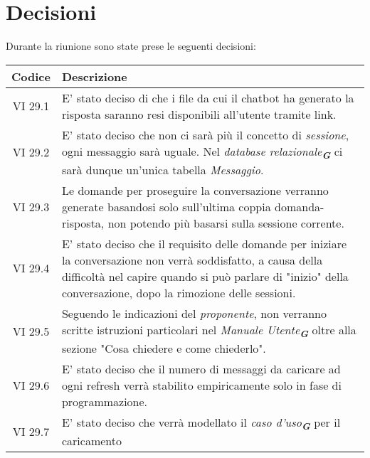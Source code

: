
\section{Decisioni}

Durante la riunione sono state prese le seguenti decisioni:

\vspace{0.5cm}

\begin{table}[htbp]
    \centering
    \begin{tabular}{|c|p{}|}
        \hline
        \rowcolor[gray]{0.75}
        \textbf{Codice} & \textbf{Descrizione}\\
        \hline
        VI 29.1 & E' stato deciso di che i file da cui il chatbot ha generato la risposta saranno resi disponibili all'utente tramite
        link.\\ 
        \hline
        VI 29.2 & E' stato deciso che non ci sarà più il concetto di \emph{sessione}, ogni messaggio sarà uguale. Nel
        \emph{database relazionale}\textsubscript{\textbf{\textit{G}}} ci sarà dunque un'unica tabella \emph{Messaggio}.\\ 
        \hline
        VI 29.3 & Le domande per proseguire la conversazione verranno generate basandosi solo sull'ultima coppia domanda-risposta,
        non potendo più basarsi sulla sessione corrente.\\ 
        \hline
        VI 29.4 & E' stato deciso che il requisito delle domande per iniziare la conversazione non verrà soddisfatto, a causa della
        difficoltà nel capire quando si può parlare di "inizio" della conversazione, dopo la rimozione delle sessioni.\\ 
        \hline
        VI 29.5 & Seguendo le indicazioni del \emph{proponente}, non verranno scritte istruzioni particolari nel
        \emph{Manuale Utente}\textsubscript{\textbf{\textit{G}}} oltre alla sezione "Cosa chiedere e come chiederlo".\\ 
        \hline
        VI 29.6 & E' stato deciso che il numero di messaggi da caricare ad ogni refresh verrà stabilito empiricamente solo in fase
        di programmazione.\\ 
        \hline
        VI 29.7 & E' stato deciso che verrà modellato il \emph{caso d'uso}\textsubscript{\textbf{\textit{G}}} per il caricamento

\end{tabular}
\end{table}
